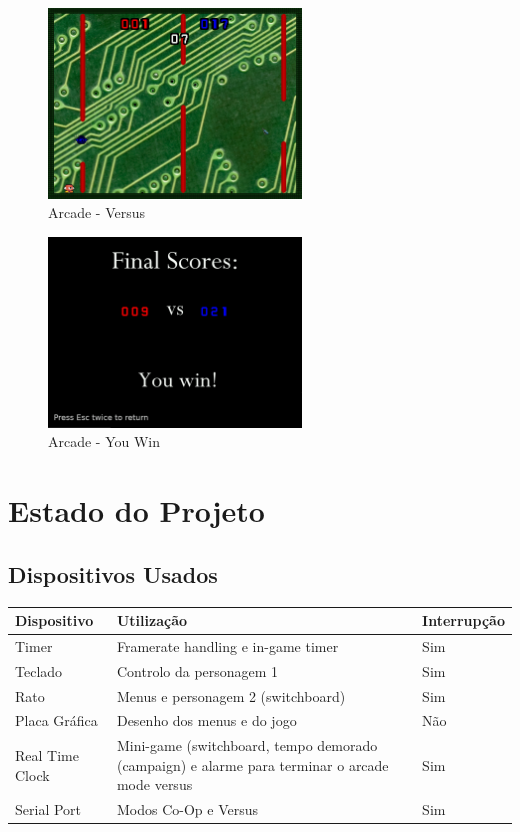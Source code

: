 \documentclass{report}
\begin{document}
\begin{figure}[H]
	\centering
	\includegraphics[width=0.6\textwidth]{arcade_versus}
	\caption{Arcade - Versus}
	\label{fig:arcade_versus}
\end{figure}


\begin{figure}[H]
	\centering
	\includegraphics[width=0.6\textwidth]{arcade_you_win}
	\caption{Arcade - You Win}
	\label{fig:arcade_you_win}
\end{figure}

\chapter{Estado do Projeto}

\section{Dispositivos Usados}

\begin{center}
	\begin{tabular}{|p{3cm}|p{8cm}|p{2cm}|} 
		\hline
			Dispositivo & Utilização & Interrupção \\ 
		\hline
		\hline
			Timer & Framerate handling e in-game timer  & Sim \\ 
			Teclado & Controlo da personagem 1 & Sim \\ 
			Rato & Menus e personagem 2 (switchboard) & Sim\\
			Placa Gráfica & Desenho dos menus e do jogo & Não\\
			Real Time Clock & Mini-game (switchboard, tempo demorado (campaign) e alarme para terminar o arcade mode versus & Sim\\
			Serial Port & Modos Co-Op e Versus & Sim \\
		\hline
	\end{tabular}
\end{center}
\end{document}
